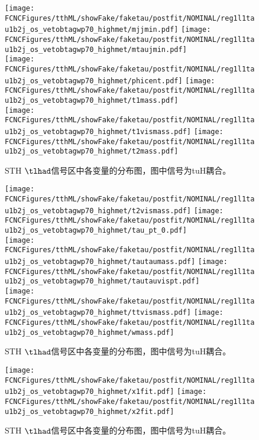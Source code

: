\begin{figure}[H]
\centering
\texttt{[image: \\FCNCFigures/tthML/showFake/faketau/postfit/NOMINAL/reg1l1tau1b2j\_os\_vetobtagwp70\_highmet/mjjmin.pdf]}
\texttt{[image: \\FCNCFigures/tthML/showFake/faketau/postfit/NOMINAL/reg1l1tau1b2j\_os\_vetobtagwp70\_highmet/mtaujmin.pdf]}
\\
\texttt{[image: \\FCNCFigures/tthML/showFake/faketau/postfit/NOMINAL/reg1l1tau1b2j\_os\_vetobtagwp70\_highmet/phicent.pdf]}
\texttt{[image: \\FCNCFigures/tthML/showFake/faketau/postfit/NOMINAL/reg1l1tau1b2j\_os\_vetobtagwp70\_highmet/t1mass.pdf]}
\\
\texttt{[image: \\FCNCFigures/tthML/showFake/faketau/postfit/NOMINAL/reg1l1tau1b2j\_os\_vetobtagwp70\_highmet/t1vismass.pdf]}
\texttt{[image: \\FCNCFigures/tthML/showFake/faketau/postfit/NOMINAL/reg1l1tau1b2j\_os\_vetobtagwp70\_highmet/t2mass.pdf]}
\\
\caption{STH $\tlhad$信号区中各变量的分布图，图中信号为tuH耦合。}
\label{fig:var_reg1l1tau1b2j_os_vetobtagwp70_highmet_1}
\end{figure}
\begin{figure}[H]
\centering
\texttt{[image: \\FCNCFigures/tthML/showFake/faketau/postfit/NOMINAL/reg1l1tau1b2j\_os\_vetobtagwp70\_highmet/t2vismass.pdf]}
\texttt{[image: \\FCNCFigures/tthML/showFake/faketau/postfit/NOMINAL/reg1l1tau1b2j\_os\_vetobtagwp70\_highmet/tau\_pt\_0.pdf]}
\\
\texttt{[image: \\FCNCFigures/tthML/showFake/faketau/postfit/NOMINAL/reg1l1tau1b2j\_os\_vetobtagwp70\_highmet/tautaumass.pdf]}
\texttt{[image: \\FCNCFigures/tthML/showFake/faketau/postfit/NOMINAL/reg1l1tau1b2j\_os\_vetobtagwp70\_highmet/tautauvispt.pdf]}
\\
\texttt{[image: \\FCNCFigures/tthML/showFake/faketau/postfit/NOMINAL/reg1l1tau1b2j\_os\_vetobtagwp70\_highmet/ttvismass.pdf]}
\texttt{[image: \\FCNCFigures/tthML/showFake/faketau/postfit/NOMINAL/reg1l1tau1b2j\_os\_vetobtagwp70\_highmet/wmass.pdf]}
\\
\caption{STH $\tlhad$信号区中各变量的分布图，图中信号为tuH耦合。}
\label{fig:var_reg1l1tau1b2j_os_vetobtagwp70_highmet_2}
\end{figure}
\begin{figure}[H]
\centering
\texttt{[image: \\FCNCFigures/tthML/showFake/faketau/postfit/NOMINAL/reg1l1tau1b2j\_os\_vetobtagwp70\_highmet/x1fit.pdf]}
\texttt{[image: \\FCNCFigures/tthML/showFake/faketau/postfit/NOMINAL/reg1l1tau1b2j\_os\_vetobtagwp70\_highmet/x2fit.pdf]}
\\
\caption{STH $\tlhad$信号区中各变量的分布图，图中信号为tuH耦合。}
\label{fig:var_reg1l1tau1b2j_os_vetobtagwp70_highmet}
\end{figure}
